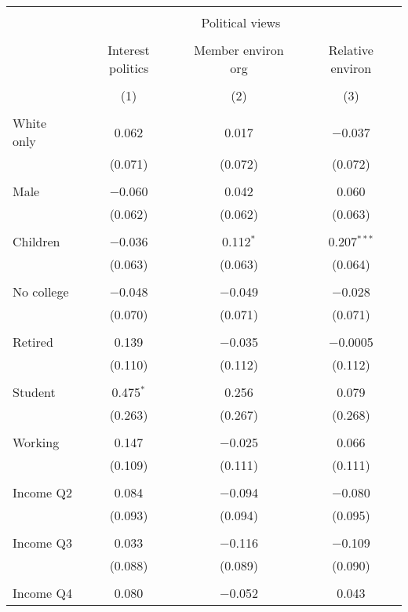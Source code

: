 
\begin{tabular}{@{\extracolsep{5pt}}lccc} 
\\[-1.8ex]\hline 
\hline \\[-1.8ex] 
 & \multicolumn{3}{c}{Political views} \\ 
\cline{2-4} 
\\[-1.8ex] & Interest politics & Member environ org & Relative environ \\ 
\\[-1.8ex] & (1) & (2) & (3)\\ 
\hline \\[-1.8ex] 
 White only & 0.062 & 0.017 & $-$0.037 \\ 
  & (0.071) & (0.072) & (0.072) \\ 
  & & & \\ 
 Male & $-$0.060 & 0.042 & 0.060 \\ 
  & (0.062) & (0.062) & (0.063) \\ 
  & & & \\ 
 Children & $-$0.036 & 0.112$^{*}$ & 0.207$^{***}$ \\ 
  & (0.063) & (0.063) & (0.064) \\ 
  & & & \\ 
 No college & $-$0.048 & $-$0.049 & $-$0.028 \\ 
  & (0.070) & (0.071) & (0.071) \\ 
  & & & \\ 
 Retired & 0.139 & $-$0.035 & $-$0.0005 \\ 
  & (0.110) & (0.112) & (0.112) \\ 
  & & & \\ 
 Student & 0.475$^{*}$ & 0.256 & 0.079 \\ 
  & (0.263) & (0.267) & (0.268) \\ 
  & & & \\ 
 Working & 0.147 & $-$0.025 & 0.066 \\ 
  & (0.109) & (0.111) & (0.111) \\ 
  & & & \\ 
 Income Q2 & 0.084 & $-$0.094 & $-$0.080 \\ 
  & (0.093) & (0.094) & (0.095) \\ 
  & & & \\ 
 Income Q3 & 0.033 & $-$0.116 & $-$0.109 \\ 
  & (0.088) & (0.089) & (0.090) \\ 
  & & & \\ 
 Income Q4 & 0.080 & $-$0.052 & 0.043 \\ 

\end{tabular}
